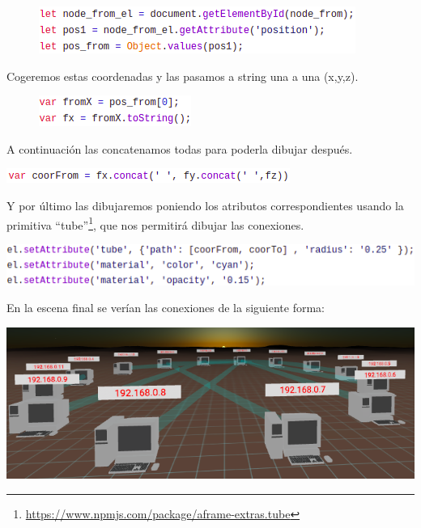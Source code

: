 \documentclass[a4paper, 12pt]{book}
\begin{document}
\begin{figure}[h]
\centering
    \includegraphics[scale=0.7]{img/getPos_comp_connect.png}
\end{figure}

Cogeremos estas coordenadas y las pasamos a string una a una (x,y,z).
\begin{figure}[h]
\centering
    \includegraphics[scale=0.7]{img/xFrom_comp_connect.png}
\end{figure}

A continuación las concatenamos todas para poderla dibujar después.
\begin{center}
    \includegraphics[scale=0.7]{img/concat_comp_connect.png}
\end{center}


Y por último las dibujaremos poniendo los atributos correspondientes usando la primitiva “tube”\footnote{\url{https://www.npmjs.com/package/aframe-extras.tube}}, que nos permitirá dibujar las conexiones.

\begin{center}
    \includegraphics[scale=0.7]{img/draw_comp_connect.png}
\end{center}

En la escena final se verían las conexiones de la siguiente forma:
\begin{center}
    \includegraphics[scale=0.58]{img/componenteCOnnect_modelo.png}
\end{center}
\end{document}
